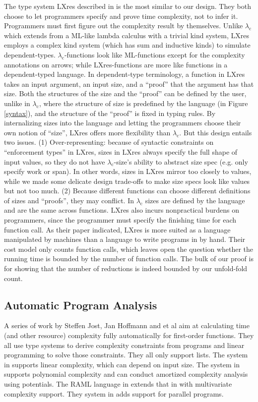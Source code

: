 \documentclass[preprint]{sigplanconf}
\newcommand{\logo}{\lambda_\mathrm{c}}
\begin{document}
The type system LXres described in \cite{crary2000} is the most similar to our design. They both choose to let programmers specify and prove time complexity, not to infer it. Programmers must first figure out the complexity result by themselves. Unlike $\logo$ which extends from a ML-like lambda calculus with a trivial kind system, LXres employs a complex kind system (which has sum and inductive kinds) to simulate dependent-types. $\logo$-functions look like ML-functions except for the complexity annotations on arrows; while LXres-functions are more like functions in a dependent-typed language. In dependent-type terminology, a function in LXres takes an input argument, an input size, and a ``proof'' that the argument has that size. Both the structures of the size and the ``proof'' can be defined by the user, unlike in $\logo$, where the structure of size is predefined by the language (in Figure \ref{syntax}), and the structure of the ``proof'' is fixed in typing rules. By internalizing sizes into the language and letting the programmers choose their own notion of ``size'', LXres offers more flexibility than $\logo$. But this design entails two issues. (1) Over-representing: because of syntactic constraints on ``enforcement types'' in LXres, sizes in LXres always specify the full shape of input values, so they do not have $\logo$-size's ability to abstract size spec (e.g. only specify work or span). In other words, sizes in LXres mirror too closely to values, while we made some delicate design trade-offs to make size specs look like values but not too much.  (2) Because different functions can choose different definitions of sizes and ``proofs'', they may conflict. In $\logo$ sizes are defined by the language and are the same across functions. LXres also incurs nonpractical burdens on programmers, since the programmer must specify the finishing time for each function call. As their paper indicated, LXres is more suited as a language manipulated by machines than a language to write programs in by hand. Their cost model only counts function calls, which leaves open the question whether the running time is bounded by the number of function calls. The bulk of our proof is for showing that the number of reductions is indeed bounded by our unfold-fold count.

\subsection{Automatic Program Analysis}

A series of work by Steffen Jost, Jan Hoffmann and et al aim at calculating time (and other resource) complexity fully automatically for first-order functions. They all use type systems to derive complexity constraints from programs and linear programming to solve those constraints. They all only support lists. The system in \cite{jost2010} supports linear complexity, which can depend on input size. The system in \cite{hoffmann2010} supports polynomial complexity and can conduct amortized complexity analysis using potentials. The RAML language in \cite{hoffmann2012} extends that in \cite{hoffmann2010} with multivariate complexity support. They system in \cite{hoffmann2015} adds support for parallel programs.
\end{document}
